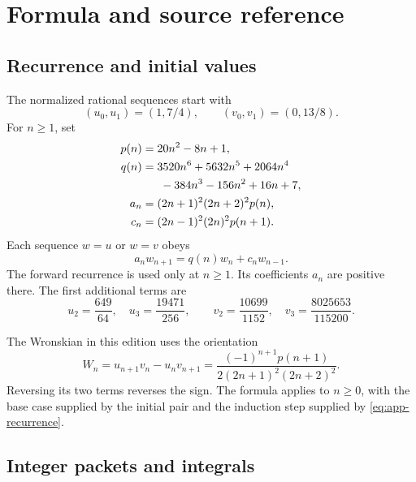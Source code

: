 \chapter{Formula and source reference}
\label{app:formula-reference}

\section{Recurrence and initial values}

The normalized rational sequences start with
\begin{equation}
 (u_0,u_1)=(1,7/4),\qquad(v_0,v_1)=(0,13/8).
 \label{eq:app-initial}
\end{equation}
For $n\geq1$, set
\begin{align}
 p(n)&=20n^2-8n+1,\notag\\
 q(n)&=3520n^6+5632n^5+2064n^4\notag\\
 &\hspace{1.6em}-384n^3-156n^2+16n+7,\notag\\
 a_n&=(2n+1)^2(2n+2)^2p(n),\notag\\
 c_n&=(2n-1)^2(2n)^2p(n+1).
 \label{eq:app-recurrence-coeffs}
\end{align}
Each sequence $w=u$ or $w=v$ obeys
\begin{equation}
 a_nw_{n+1}=q(n)w_n+c_nw_{n-1}.
 \label{eq:app-recurrence}
\end{equation}
The forward recurrence is used only at $n\geq1$. Its coefficients $a_n$ are positive there. The first additional terms are
\begin{equation}
 u_2=\frac{649}{64},\quad u_3=\frac{19471}{256},\qquad
 v_2=\frac{10699}{1152},\quad v_3=\frac{8025653}{115200}.
 \label{eq:app-small-sequences}
\end{equation}

The Wronskian in this edition uses the orientation
\begin{equation}
 W_n=u_{n+1}v_n-u_nv_{n+1}
 =\frac{(-1)^{n+1}p(n+1)}{2(2n+1)^2(2n+2)^2}.
 \label{eq:app-Wronskian}
\end{equation}
Reversing its two terms reverses the sign. The formula applies to $n\geq0$, with the base case supplied by the initial pair and the induction step supplied by \eqref{eq:app-recurrence}.

\section{Integer packets and integrals}

